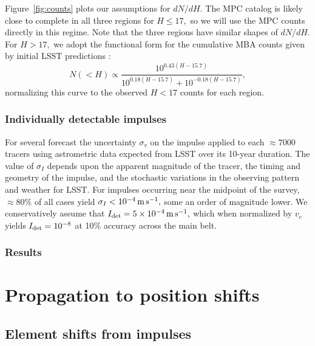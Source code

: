 \documentclass[linenumbers, onecolumn]{aastex631}
\begin{document}
Figure~\ref{fig:counts} plots our assumptions for $dN/dH.$  The MPC
catalog is likely close to complete in all three regions for $H\le17,$
so we will use the MPC counts directly in this regime.  Note that the
three regions have similar shapes of $dN/dH.$  For $H>17,$ we adopt
the functional form for the cumulative MBA counts given by
initial LSST predictions \citep{LSST_science_book}:
\begin{equation}
  N(<H) \propto \frac{10^{0.43(H-15.7)}}{10^{0.18(H-15.7)} +
    10^{-0.18(H-15.7)}},
\label{eq:lsstmba}
\end{equation}
normalizing this curve to the observed $H<17$ counts for each region.

\subsubsection{Individually detectable impulses}
For several \citet{negin} forecast the uncertainty $\sigma_v$ on the impulse 
applied to each $\approx7000$ tracers using astrometric data expected from LSST
over its 10-year duration.  The value of $\sigma_I$ depends upon the
apparent magnitude of the tracer, the timing and geometry of the
impulse, and the stochastic variations in the observing pattern and
weather for LSST.
For impulses occurring near the midpoint
of the survey, $\approx80\%$ of all cases yield $\sigma_I<10^{-4}\,{\rm m}\,{\rm
  s}^{-1},$ some an order of magnitude lower.  We conservatively
assume that $I_{\rm det}=5\times 10^{-4}\,{\rm m}\,{\rm
  s}^{-1},$ which when normalized by $v_c$ yields $I_{\rm
  det}=10^{-8}$ at 10\% accuracy across the main belt.

\subsubsection{Results}


\section{Propagation to position shifts}
\label{sec:propagation}

\subsection{Element shifts from impulses}
\label{sec:elements}
\end{document}
